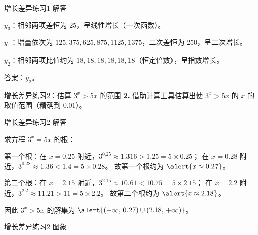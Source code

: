 \documentclass[10pt,aspectratio=169,serif]{beamer}
\begin{document}
\begin{frame}[t]{增长差异练习1 解答}
\begin{tcolorbox}[colback=orange!10,colframe=orange,title=\textbf{解}]
\textbf{$y_3$}：相邻两项差恒为 $25$，呈\alert{线性增长}（一次函数）。

\textbf{$y_1$}：增量依次为 $125, 375, 625, 875, 1125, 1375$，二次差恒为 $250$，呈\alert{二次增长}。

\textbf{$y_2$}：相邻两项比值约为 $18, 18, 18, 18, 18, 18$（恒定倍数），呈\alert{指数增长}。

\vspace{0.5em}
\alert{答案：$y_2$}。
\end{tcolorbox}
\end{frame}

\begin{frame}[t]{增长差异练习2：估算 $3^x > 5x$ 的范围}
\textbf{2.} 借助计算工具估算出使 $3^x > 5x$ 的 $x$ 的取值范围（精确到 $0.01$）。
\end{frame}

\begin{frame}[t]{增长差异练习2 解答}
\begin{tcolorbox}[colback=orange!10,colframe=orange,title=\textbf{解}]
求方程 $3^x = 5x$ 的根：

\vspace{0.3em}
第一个根：在 $x=0.25$ 附近，$3^{0.25}\approx 1.316 > 1.25 = 5\times 0.25$；
在 $x=0.28$ 附近，$3^{0.28}\approx 1.36 < 1.4 = 5\times 0.28$。
故第一个根约为 $\alert{x \approx 0.27}$。

\vspace{0.3em}
第二个根：在 $x=2.15$ 附近，$3^{2.15}\approx 10.61 < 10.75 = 5\times 2.15$；
在 $x=2.2$ 附近，$3^{2.2}\approx 11.21 > 11 = 5\times 2.2$。
故第二个根约为 $\alert{x \approx 2.18}$。

\vspace{0.3em}
因此 $3^x > 5x$ 的解集为 $\alert{(-\infty,\,0.27)\cup(2.18,\,+\infty)}$。
\end{tcolorbox}
\end{frame}

\begin{frame}[t]{增长差异练习2 图象}
\begin{center}
\end{center}
\end{frame}
\end{document}
